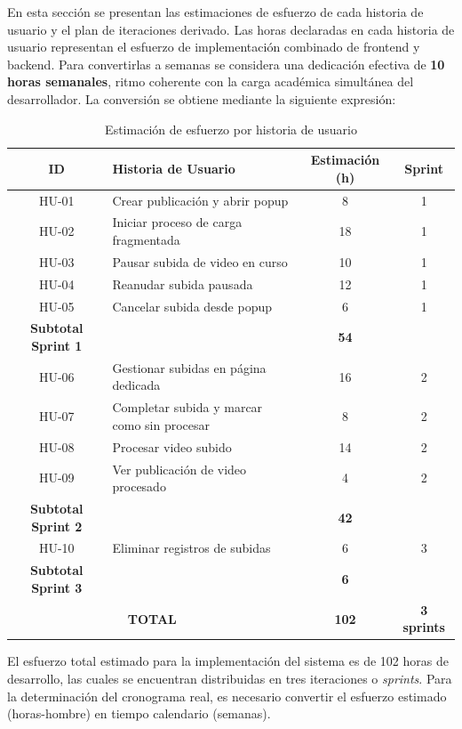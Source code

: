 En esta sección se presentan las estimaciones de esfuerzo de cada historia de usuario y el plan de
iteraciones derivado. Las horas declaradas en cada historia de usuario representan el esfuerzo de
implementación combinado de frontend y backend. Para convertirlas a semanas se considera una
dedicación efectiva de \textbf{10 horas semanales}, ritmo coherente con la carga académica
simultánea del desarrollador. La conversión se obtiene mediante la siguiente expresión:

\begin{table}[htbp]
\centering
\caption{Estimación de esfuerzo por historia de usuario}
\label{tab:estimacion}
\begin{tabular}{|c|l|c|c|}
\hline
\textbf{ID} & \textbf{Historia de Usuario} & \textbf{Estimación (h)} & \textbf{Sprint} \\
\hline
HU-01 & Crear publicación y abrir popup & 8 & 1 \\
\hline
HU-02 & Iniciar proceso de carga fragmentada & 18 & 1 \\
\hline
HU-03 & Pausar subida de video en curso & 10 & 1 \\
\hline
HU-04 & Reanudar subida pausada & 12 & 1 \\
\hline
HU-05 & Cancelar subida desde popup & 6 & 1 \\
\hline
\textbf{Subtotal Sprint 1} & & \textbf{54} & \\
\hline
HU-06 & Gestionar subidas en página dedicada & 16 & 2 \\
\hline
HU-07 & Completar subida y marcar como sin procesar & 8 & 2 \\
\hline
HU-08 & Procesar video subido & 14 & 2 \\
\hline
HU-09 & Ver publicación de video procesado & 4 & 2 \\
\hline
\textbf{Subtotal Sprint 2} & & \textbf{42} & \\
\hline
HU-10 & Eliminar registros de subidas & 6 & 3 \\
\hline
\textbf{Subtotal Sprint 3} & & \textbf{6} & \\
\hline
\multicolumn{2}{|c|}{\textbf{TOTAL}} & \textbf{102} & \textbf{3 sprints} \\
\hline
\end{tabular}
\end{table}

El esfuerzo total estimado para la implementación del sistema es de 102 horas de desarrollo, las cuales 
se encuentran distribuidas en tres iteraciones o \textit{sprints}. Para la determinación del cronograma real, 
es necesario convertir el esfuerzo estimado (horas-hombre) en tiempo calendario (semanas).

